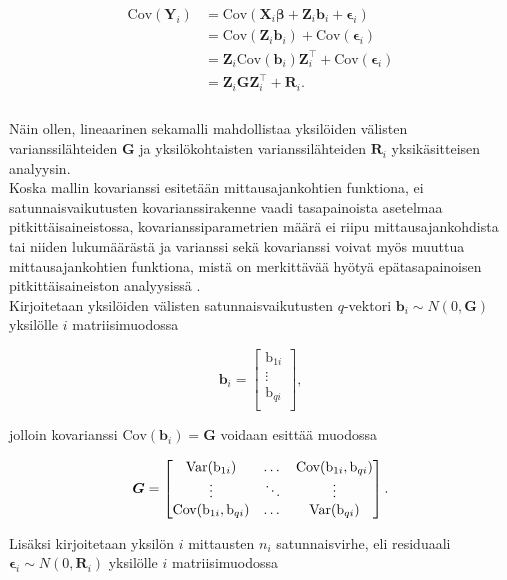 \documentclass[finnish]{docopts}
\begin{document}
$$
\begin{aligned}
\text{Cov}(\bm{Y}_i) &= \text{Cov}(\bm{X}_i \bm{\beta} +\bm{Z}_i\bm{b}_i + \bm{\epsilon}_i) \\
&= \text{Cov}(\bm{Z}_i \bm{b}_i) + \text{Cov}(\bm{\epsilon}_i) \\
&= \bm{Z}_i \text{Cov} (\bm{b}_i) \bm{Z}^\top_i + \text{Cov}(\bm{\epsilon}_i)\\
&= \bm{Z}_i \bm{G} \bm{Z}^\top_i + \bm{R}_i.\\
\end{aligned}
$$ \\

Näin ollen, lineaarinen sekamalli mahdollistaa yksilöiden välisten varianssilähteiden $\bm{G}$ ja yksilökohtaisten varianssilähteiden $\bm{R}_i$ yksikäsitteisen analyysin. \\

Koska mallin kovarianssi esitetään mittausajankohtien funktiona, ei satunnaisvaikutusten kovarianssirakenne vaadi tasapainoista asetelmaa pitkittäisaineistossa, kovarianssiparametrien määrä ei riipu mittausajankohdista tai niiden lukumäärästä ja varianssi sekä kovarianssi voivat myös muuttua mittausajankohtien funktiona, mistä on merkittävää hyötyä epätasapainoisen pitkittäisaineiston analyysissä \cite{fitzmaurice11}. \\

Kirjoitetaan yksilöiden välisten satunnaisvaikutusten $q$-vektori $\bm{b}_i \sim N(0,\bm{G})$ yksilölle $i$ matriisimuodossa

$$
\bm{b}_i =
\begin{bmatrix}
\text{b}_{1i} \\
\vdots \\
\text{b}_{qi} \\
\end{bmatrix},
$$

jolloin kovarianssi  $\text{Cov}(\bm{b}_i) = \bm{G}$ voidaan esittää muodossa

$$
\bm{G} =
\begin{bmatrix}
\text{Var}(\text{b}_{1i}) & \dots & \text{Cov}(\text{b}_{1i}, \text{b}_{qi}) \\
\vdots & \ddots & \vdots \\
\text{Cov}(\text{b}_{1i}, \text{b}_{qi}) & \dots & \text{Var}(\text{b}_{qi}) \\
\end{bmatrix}. \\
$$

Lisäksi kirjoitetaan yksilön $i$ mittausten $n_i$ satunnaisvirhe, eli residuaali $\bm{\epsilon}_i \sim N(0,\bm{R}_i)$ yksilölle $i$ matriisimuodossa
\end{document}
